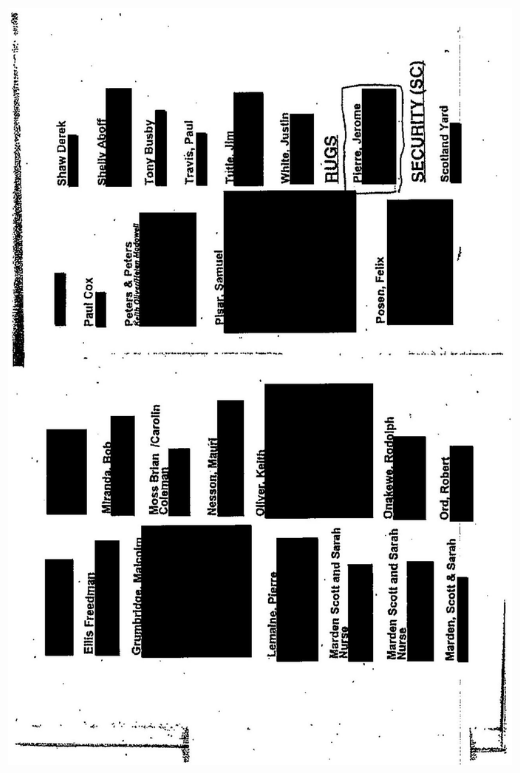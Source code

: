 \documentclass[10pt]{article}
\begin{document}
\includegraphics[max width=\textwidth, center]{2025_02_27_dd68c3d38de88f0516d9g-209}\\
\end{document}
